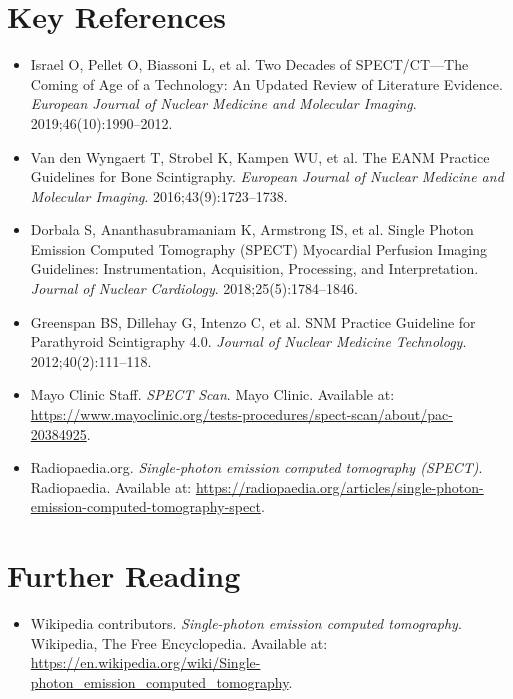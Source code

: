 \section{Key References}
\begin{itemize}
    \item Israel O, Pellet O, Biassoni L, et al. Two Decades of SPECT/CT---The Coming of Age of a Technology: An Updated Review of Literature Evidence. \textit{European Journal of Nuclear Medicine and Molecular Imaging}. 2019;46(10):1990--2012.
    \item Van den Wyngaert T, Strobel K, Kampen WU, et al. The EANM Practice Guidelines for Bone Scintigraphy. \textit{European Journal of Nuclear Medicine and Molecular Imaging}. 2016;43(9):1723--1738.
    \item Dorbala S, Ananthasubramaniam K, Armstrong IS, et al. Single Photon Emission Computed Tomography (SPECT) Myocardial Perfusion Imaging Guidelines: Instrumentation, Acquisition, Processing, and Interpretation. \textit{Journal of Nuclear Cardiology}. 2018;25(5):1784--1846.
    \item Greenspan BS, Dillehay G, Intenzo C, et al. SNM Practice Guideline for Parathyroid Scintigraphy 4.0. \textit{Journal of Nuclear Medicine Technology}. 2012;40(2):111--118.
    \item Mayo Clinic Staff. \textit{SPECT Scan}. Mayo Clinic. Available at: \url{https://www.mayoclinic.org/tests-procedures/spect-scan/about/pac-20384925}.
    \item Radiopaedia.org. \textit{Single-photon emission computed tomography (SPECT)}. Radiopaedia. Available at: \url{https://radiopaedia.org/articles/single-photon-emission-computed-tomography-spect}.
\end{itemize}

\section{Further Reading}
\begin{itemize}
  \item Wikipedia contributors. \textit{Single-photon emission computed tomography}. Wikipedia, The Free Encyclopedia. Available at: \url{https://en.wikipedia.org/wiki/Single-photon_emission_computed_tomography}.
\end{itemize}
